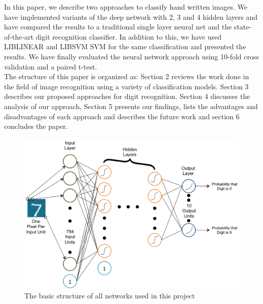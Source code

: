 \documentclass[10pt,twocolumn,letterpaper]{article}
\begin{document}
In this paper, we describe two approaches to classify hand written images. We have implemented variants of the deep network with 2, 3 and 4 hidden layers and have compared the results to a traditional single layer neural net and the state-of-the-art digit recognition classifier.  In addition to this, we have used LIBLINEAR\cite{REF08a} and LIBSVM \cite{CC01a} SVM for the same classification and presented the results. We have finally evaluated the neural network approach using 10-fold cross validation and a paired t-test.\\

The structure of this paper is organized as: Section 2 reviews the work done in the field of image recognition using a variety of classification models. Section 3 describes our proposed approaches for digit recognition. Section 4 discusses the analysis of our approach, Section 5 presents our findings, lists the advantages and disadvantages of each approach and describes the future work and section 6 concludes the paper.
\begin{figure}
\label{fig:structure}
\begin{center}
	\includegraphics[scale=0.7]{../images/Network.png}
\end{center}
   \caption{The basic structure of all networks used in this project}
\end{figure}
\end{document}
